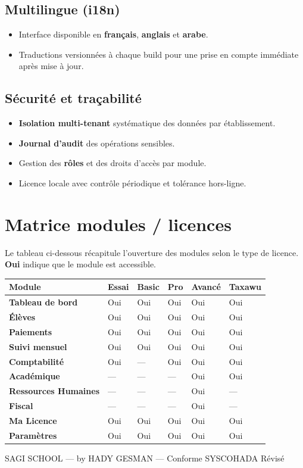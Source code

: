 \documentclass[11pt,a4paper]{report}
\newcommand{\feat}[1]{\item #1}
\begin{document}
\section{Multilingue (i18n)}
\begin{itemize}
\feat{Interface disponible en \textbf{français}, \textbf{anglais} et
\textbf{arabe}.}
\feat{Traductions versionnées à chaque build pour une prise en compte
immédiate après mise à jour.}
\end{itemize}

\section{Sécurité et traçabilité}
\begin{itemize}
\feat{\textbf{Isolation multi-tenant} systématique des données par
établissement.}
\feat{\textbf{Journal d'audit} des opérations sensibles.}
\feat{Gestion des \textbf{rôles} et des droits d'accès par module.}
\feat{Licence locale avec contrôle périodique et tolérance hors-ligne.}
\end{itemize}

\chapter{Matrice modules / licences}
\label{ch:matrice}

Le tableau ci-dessous récapitule l'ouverture des modules selon le type de
licence. \textbf{Oui} indique que le module est accessible.

\begin{center}
\renewcommand{\arraystretch}{1.3}
\begin{tabularx}{\textwidth}{>{\bfseries\small}l *{5}{>{\centering\arraybackslash\small}X}}
\toprule
Module & Essai & Basic & Pro & Avancé & Taxawu \\
\midrule
Tableau de bord & Oui & Oui & Oui & Oui & Oui \\
Élèves          & Oui & Oui & Oui & Oui & Oui \\
Paiements       & Oui & Oui & Oui & Oui & Oui \\
Suivi mensuel   & Oui & Oui & Oui & Oui & Oui \\
Comptabilité    & Oui & --- & Oui & Oui & Oui \\
Académique      & --- & --- & --- & Oui & Oui \\
Ressources Humaines & --- & --- & --- & Oui & --- \\
Fiscal          & --- & --- & --- & Oui & --- \\
\midrule
Ma Licence      & Oui & Oui & Oui & Oui & Oui \\
Paramètres      & Oui & Oui & Oui & Oui & Oui \\
\bottomrule
\end{tabularx}
\end{center}

\vspace{1cm}
\begin{center}
{\color{sagigray}\small SAGI SCHOOL --- by HADY GESMAN --- Conforme SYSCOHADA Révisé}
\end{center}
\end{document}
